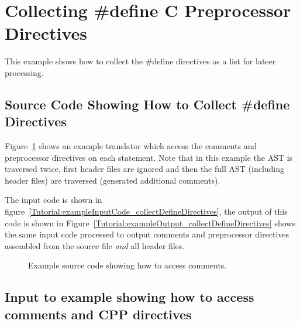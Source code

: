 \section{Collecting \#define C Preprocessor Directives}

   This example shows how to collect the \#define directives as
a list for lateer processing.

\subsection{Source Code Showing How to Collect \#define Directives}

    Figure~\ref{Tutorial:example_collectDefineDirectives}
shows an example translator which access the comments and preprocessor directives on each
statement. Note that in this example the AST is traversed twice, first header files are
ignored and then the full AST (including header files) are traversed (generated additional
comments).

The input code is shown in figure~\ref{Tutorial:exampleInputCode_collectDefineDirectives},
the output of this code is shown in 
Figure~\ref{Tutorial:exampleOutput_collectDefineDirectives} shows the
same input code processed to output comments and preprocessor directives assembled from 
the source file {\em and} all header files.

\begin{figure}[!h]
{\indent
{\mySmallFontSize

\begin{latexonly}
   
\end{latexonly}

\begin{htmlonly}
   
\end{htmlonly}

}
}
\caption{Example source code showing how to access comments. }
\label{Tutorial:example_collectDefineDirectives}
\end{figure}



\subsection{Input to example showing how to access comments and CPP directives}

